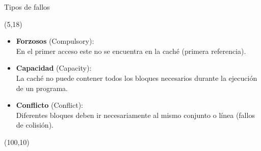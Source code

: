 \documentclass[aspectratio=169]{beamer}
\begin{document}
\begin{frame}{Tipos de fallos}
    \begin{textblock}{80}(5,18)
    \begin{itemize}
    \item<1-> \textbf{Forzosos} (Compulsory):\\ En el primer acceso este no se encuentra en la caché (primera referencia).
    \vskip 25pt
    \item<2-> \textbf{Capacidad} (Capacity):\\ La caché no puede contener todos los bloques necesarios durante la ejecución de un programa.
    \vskip 25pt
    \item<3-> \textbf{Conflicto} (Conflict):\\ Diferentes bloques deben ir necesariamente al mismo conjunto o línea (fallos de colisión).
    \end{itemize}
    \end{textblock}
    \begin{textblock}{80}(100,10)
    \vspace{0.9cm}
    \vspace{0.9cm}
    \end{textblock}
\end{frame}
\end{document}
